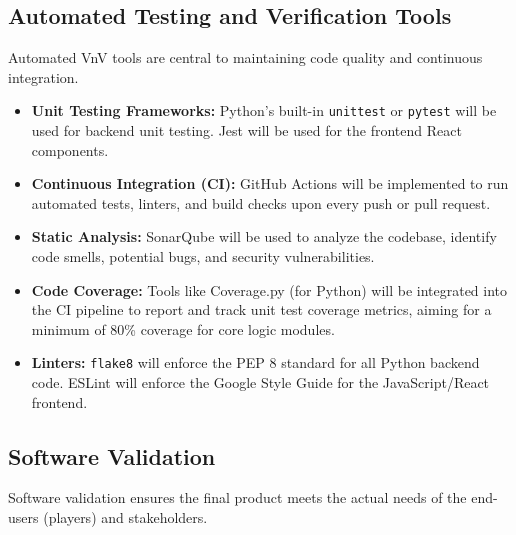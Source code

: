 \documentclass[12pt, titlepage]{article}
\begin{document}
\subsection{Automated Testing and Verification Tools}


Automated VnV tools are central to maintaining code quality and continuous integration.

\begin{itemize}
    \item \textbf{Unit Testing Frameworks:} Python’s built-in \texttt{unittest} or \texttt{pytest} will be used for backend unit testing. Jest will be used for the frontend React components.
    \item \textbf{Continuous Integration (CI):} GitHub Actions will be implemented to run automated tests, linters, and build checks upon every push or pull request.
    \item \textbf{Static Analysis:} SonarQube will be used to analyze the codebase, identify code smells, potential bugs, and security vulnerabilities.
    \item \textbf{Code Coverage:} Tools like Coverage.py (for Python) will be integrated into the CI pipeline to report and track unit test coverage metrics, aiming for a minimum of 80\% coverage for core logic modules.
    \item \textbf{Linters:} \texttt{flake8} will enforce the PEP 8 standard for all Python backend code. ESLint will enforce the Google Style Guide for the JavaScript/React frontend.
\end{itemize}



\subsection{Software Validation}



Software validation ensures the final product meets the actual needs of the end-users (players) and stakeholders.
\end{document}
